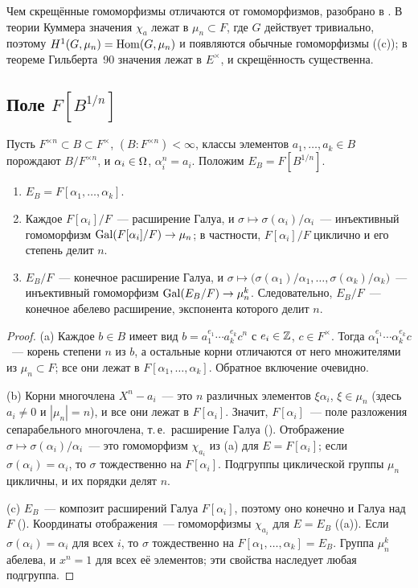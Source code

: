 \begin{aside}
Чем скрещённые гомоморфизмы отличаются от гомоморфизмов, разобрано в . В теории Куммера значения $\chi_a$ лежат в
$\mu_n\subset F$, где $G$ действует тривиально, поэтому $H^1(G,\mu_n)=\operatorname{Hom}(G,\mu_n)$ и появляются обычные гомоморфизмы
((c)); в теореме Гильберта~90 значения лежат в $E^\times$, и скрещённость существенна.
\end{aside}

\subsection*{Поле $F[B^{1/n}]$}

\begin{lemma}[5.30f]
Пусть $F^{\times n}\subset B\subset F^\times$, $(B:F^{\times n})<\infty$, классы элементов $a_1,\dots,a_k\in B$
порождают $B/F^{\times n}$, и $\alpha_i\in\Omega$, $\alpha_i^n=a_i$. Положим $E_B=F[B^{1/n}]$.
\begin{enumerate}[label=\textup{(\alph*)}]
\item $E_B=F[\alpha_1,\dots,\alpha_k]$.
\item Каждое $F[\alpha_i]/F$~--- расширение Галуа, и $\sigma\mapsto\sigma(\alpha_i)/\alpha_i$~--- инъективный гомоморфизм
$\operatorname{Gal}(F[\alpha_i]/F)\to\mu_n$; в частности, $F[\alpha_i]/F$ циклично и его степень делит $n$.
\item $E_B/F$~--- конечное расширение Галуа, и $\sigma\mapsto\bigl(\sigma(\alpha_1)/\alpha_1,\dots,
\sigma(\alpha_k)/\alpha_k\bigr)$~--- инъективный гомоморфизм $\operatorname{Gal}(E_B/F)\to\mu_n^k$. Следовательно, $E_B/F$~---
конечное абелево расширение, экспонента которого делит $n$.
\end{enumerate}
\end{lemma}

\begin{proof}
(a) Каждое $b\in B$ имеет вид $b=a_1^{e_1}\cdots a_k^{e_k}c^n$ с $e_i\in\mathbb Z$, $c\in F^\times$. Тогда
$\alpha_1^{e_1}\cdots\alpha_k^{e_k}c$~--- корень степени $n$ из $b$, а остальные корни отличаются от него множителями из
$\mu_n\subset F$; все они лежат в $F[\alpha_1,\dots,\alpha_k]$. Обратное включение очевидно.

(b) Корни многочлена $X^n-a_i$~--- это $n$ различных элементов $\xi\alpha_i$, $\xi\in\mu_n$ (здесь $a_i\ne0$ и
$|\mu_n|=n$), и все они лежат в $F[\alpha_i]$. Значит, $F[\alpha_i]$~--- поле разложения сепарабельного многочлена, т.\,е.\
расширение Галуа (). Отображение $\sigma\mapsto\sigma(\alpha_i)/\alpha_i$~--- это гомоморфизм $\chi_{a_i}$ из (a)
для $E=F[\alpha_i]$; если $\sigma(\alpha_i)=\alpha_i$, то $\sigma$ тождественно на $F[\alpha_i]$. Подгруппы циклической
группы $\mu_n$ цикличны, и их порядки делят $n$.

(c) $E_B$~--- композит расширений Галуа $F[\alpha_i]$, поэтому оно конечно и Галуа над $F$ (). Координаты
отображения~--- гомоморфизмы $\chi_{a_i}$ для $E=E_B$ (\rf{5.30d}(a)). Если $\sigma(\alpha_i)=\alpha_i$ для всех $i$, то
$\sigma$ тождественно на $F[\alpha_1,\dots,\alpha_k]=E_B$. Группа $\mu_n^k$ абелева, и $x^n=1$ для всех её элементов; эти
свойства наследует любая подгруппа.
\end{proof}

